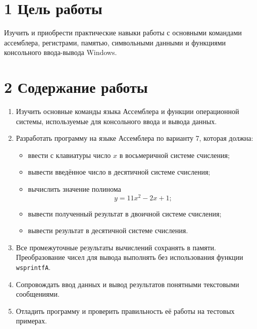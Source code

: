 \documentclass[12pt,a4paper]{article}
\begin{document}

\section*{1 Цель работы}
Изучить и приобрести практические навыки работы с основными командами
ассемблера, регистрами, памятью, символьными данными и функциями
консольного ввода-вывода Windows.

\section*{2 Содержание работы}
\begin{enumerate}
\item Изучить основные команды языка Ассемблера и функции операционной
системы, используемые для консольного ввода и вывода данных.
\item Разработать программу на языке Ассемблера по варианту 7, которая должна:
\begin{itemize}
\item ввести с клавиатуры число $x$ в восьмеричной системе счисления;
\item вывести введённое число в десятичной системе счисления;
\item вычислить значение полинома
\[
y = 11x^2 - 2x + 1;
\]
\item вывести полученный результат в двоичной системе счисления;
\item вывести результат в десятичной системе счисления.
\end{itemize}
\item Все промежуточные результаты вычислений сохранять в памяти.
Преобразование чисел для вывода выполнять без использования функции
\texttt{wsprintfA}.
\item Сопровождать ввод данных и вывод результатов понятными текстовыми сообщениями.
\item Отладить программу и проверить правильность её работы на тестовых примерах.
\end{enumerate}
\end{document}

